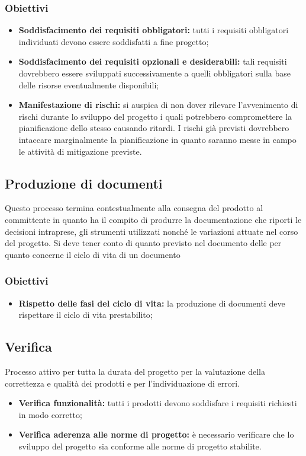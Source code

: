 \subsubsection{Obiettivi}
\begin{itemize}
    \item \textbf{Soddisfacimento dei requisiti obbligatori:} tutti i requisiti obbligatori individuati devono essere soddisfatti a fine progetto;
    \item \textbf{Soddisfacimento dei requisiti opzionali e desiderabili:} tali requisiti dovrebbero essere sviluppati successivamente a quelli obbligatori sulla base delle
          risorse eventualmente disponibili;
    \item \textbf{Manifestazione di rischi:} si auspica di non dover rilevare l'avvenimento di rischi durante lo sviluppo del progetto i quali potrebbero compromettere
          la pianificazione dello stesso causando ritardi. I rischi già previsti dovrebbero intaccare marginalmente la pianificazione in quanto saranno messe in campo le attività
          di mitigazione previste.
\end{itemize}

\subsection{Produzione di documenti}
Questo processo termina contestualmente alla consegna del prodotto al committente in quanto ha il compito di produrre la documentazione che riporti le decisioni intraprese,
gli strumenti utilizzati nonché le variazioni attuate nel corso del progetto. Si deve tener conto di quanto previsto nel documento delle  per quanto
concerne il ciclo di vita di un documento

\subsubsection{Obiettivi}
\begin{itemize}
    \item \textbf{Rispetto delle fasi del ciclo di vita:} la produzione di documenti deve rispettare il ciclo di vita prestabilito;
\end{itemize}


\subsection{Verifica}
Processo attivo per tutta la durata del progetto per la valutazione della correttezza e qualità dei prodotti e per l'individuazione di errori.
\begin{itemize}
    \item  \textbf{Verifica funzionalità:} tutti i prodotti devono soddisfare i requisiti richiesti in modo corretto;
    \item \textbf{Verifica aderenza alle norme di progetto:} è necessario verificare che lo sviluppo del progetto sia conforme alle norme di progetto stabilite.
\end{itemize}

